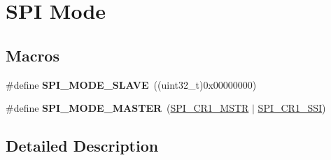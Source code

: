 \hypertarget{group___s_p_i__mode}{}\section{S\+PI Mode}
\label{group___s_p_i__mode}
\subsection*{Macros}
\begin{DoxyCompactItemize}
\item 
\#define {\bfseries S\+P\+I\+\_\+\+M\+O\+D\+E\+\_\+\+S\+L\+A\+VE}~((uint32\+\_\+t)0x00000000)\hypertarget{group___s_p_i__mode_ga75f094fee5a9dc10b88401ccd17925d3}{}\label{group___s_p_i__mode_ga75f094fee5a9dc10b88401ccd17925d3}

\item 
\#define {\bfseries S\+P\+I\+\_\+\+M\+O\+D\+E\+\_\+\+M\+A\+S\+T\+ER}~(\hyperlink{group___peripheral___registers___bits___definition_ga5b3b6ae107fc37bf18e14506298d7a55}{S\+P\+I\+\_\+\+C\+R1\+\_\+\+M\+S\+TR} $\vert$ \hyperlink{group___peripheral___registers___bits___definition_ga5f154374b58c0234f82ea326cb303a1e}{S\+P\+I\+\_\+\+C\+R1\+\_\+\+S\+SI})\hypertarget{group___s_p_i__mode_gaa335c2abdfad9e6f6c2677719d93b64e}{}\label{group___s_p_i__mode_gaa335c2abdfad9e6f6c2677719d93b64e}

\end{DoxyCompactItemize}


\subsection{Detailed Description}
